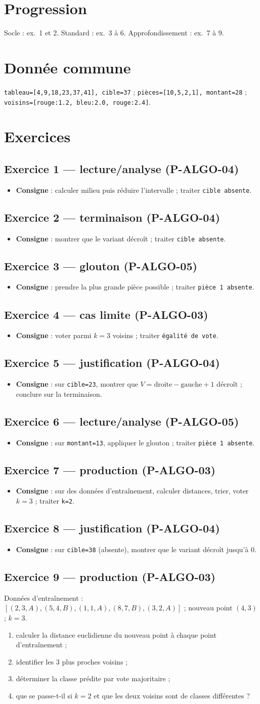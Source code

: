 \documentclass[a4paper,11pt]{article}
\newcommand{\exo}[4]{\subsection*{Exercice #1 — #2 (#3)}\begin{itemize}[nosep]\item \textbf{Consigne} : #4\end{itemize}}
\begin{document}

\section*{Progression}
Socle : ex.~1 et 2. \quad Standard : ex.~3 à 6. \quad Approfondissement : ex.~7 à 9.

\section*{Donnée commune}
\texttt{tableau=[4,9,18,23,37,41], cible=37} ; \texttt{pièces=[10,5,2,1], montant=28} ; \texttt{voisins=[rouge:1.2, bleu:2.0, rouge:2.4]}.

\section*{Exercices}
\exo{1}{lecture/analyse}{P-ALGO-04}{calculer milieu puis réduire l'intervalle ; traiter \texttt{cible absente}.}
\exo{2}{terminaison}{P-ALGO-04}{montrer que le variant décroît ; traiter \texttt{cible absente}.}
\exo{3}{glouton}{P-ALGO-05}{prendre la plus grande pièce possible ; traiter \texttt{pièce 1 absente}.}
\exo{4}{cas limite}{P-ALGO-03}{voter parmi $k=3$ voisins ; traiter \texttt{égalité de vote}.}
\exo{5}{justification}{P-ALGO-04}{sur \texttt{cible=23}, montrer que $V = \text{droite} - \text{gauche} + 1$ décroît ; conclure sur la terminaison.}
\exo{6}{lecture/analyse}{P-ALGO-05}{sur \texttt{montant=13}, appliquer le glouton ; traiter \texttt{pièce 1 absente}.}
\exo{7}{production}{P-ALGO-03}{sur des données d'entraînement, calculer distances, trier, voter $k=3$ ; traiter \texttt{k=2}.}
\exo{8}{justification}{P-ALGO-04}{sur \texttt{cible=38} (absente), montrer que le variant décroît jusqu'à $0$.}

\subsection*{Exercice 9 — production (P-ALGO-03)}
Données d'entraînement : $[(2,3,A),(5,4,B),(1,1,A),(8,7,B),(3,2,A)]$ ; nouveau point $(4,3)$ ; $k=3$.
\begin{enumerate}[nosep,label=(9\alph*)]
  \item calculer la distance euclidienne du nouveau point à chaque point d'entraînement ;
  \item identifier les 3 plus proches voisins ;
  \item déterminer la classe prédite par vote majoritaire ;
  \item que se passe-t-il si $k=2$ et que les deux voisins sont de classes différentes ?
\end{enumerate}
\end{document}
